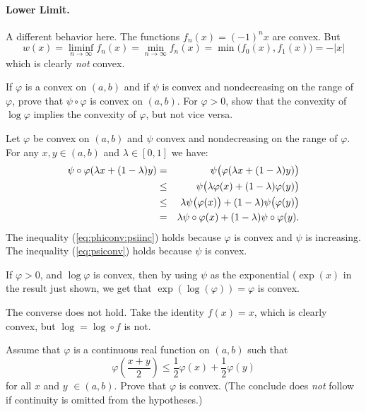 \begin{enumerate}
\paragraph{Lower Limit.} A different behavior here.
The functions \(f_n(x) = (-1)^n x\) are convex.
But
\begin{equation*}
w(x)
= \liminf_{n\to \infty} f_n(x)
= \min_{n\to \infty}f_n(x)
= \min\bigl(f_0(x),f_1(x)\bigr) = -|x|
\end{equation*}
which is clearly \emph{not} convex.


\begin{excopy}
If \(\varphi\) is a convex on \((a,b)\) and if \(\psi\) is convex and
nondecreasing on the range of \(\varphi\), prove that \(\psi\circ\varphi\)
is convex on \((a,b)\).
For \(\varphi>0\), show that the convexity of \(\log\varphi\) implies
the convexity of \(\varphi\), but not vice versa.
\end{excopy}

Let \(\varphi\) be convex on \((a,b)\) and \(\psi\)  convex and
nondecreasing on the range of \(\varphi\).
For any \(x,y\in(a,b)\) and \(\lambda\in[0,1]\) we have:
\begin{eqnarray}
\psi\circ\varphi(\lambda x + (1-\lambda)y)
 &=& \psi\bigl(\varphi(\lambda x + (1-\lambda)y)\bigr) \notag \\
 &\leq& \psi\bigl(\lambda\varphi(x) + (1-\lambda)\varphi(y)\bigr)
        \label{eq:phiconv:psiinc} \\
 &\leq& \lambda \psi\bigl(\varphi(x)\bigr) +
        (1-\lambda)\psi\bigl(\varphi(y)\bigr)
        \label{eq:psiconv} \\
 &=& \lambda \psi\circ\varphi(x) +  (1-\lambda)\psi\circ\varphi(y). \notag
\end{eqnarray}
The inequality (\ref{eq:phiconv:psiinc}) holds because \(\varphi\) is
convex and \(\psi\) is increasing.
The inequality (\ref{eq:psiconv}) holds because \(\psi\) is convex.

If \(\varphi>0\), and \(\log\varphi\) is convex, then by using \(\psi\)
as the exponential (\(\exp(x)\) in the result just shown, we get
that \(\exp(\log(\varphi)) = \varphi\) is convex.

The converse does not hold. Take the identity \(f(x)=x\), which is
clearly convex, but \(\log = \log\circ f\) is not.


\begin{excopy}
Assume that \(\varphi\) is a continuous real function on \((a,b)\)
such that
\begin{equation*}
 \varphi\left(\frac{x+y}{2}\right)
 \leq \frac{1}{2}\varphi(x) + \frac{1}{2}\varphi(y)
\end{equation*}
for all $x$ and $y$ \(\in (a,b)\). Prove that \(\varphi\) is convex.
(The conclude does \emph{not} follow if continuity is omitted from the
hypotheses.)
\end{excopy}



\end{enumerate}
